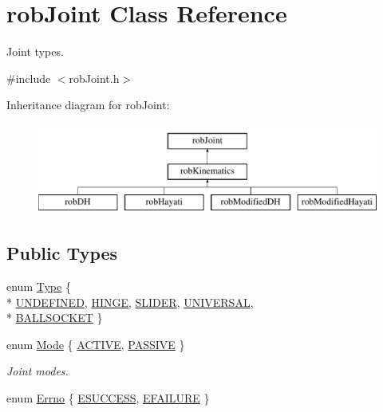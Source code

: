 \hypertarget{classrob_joint}{\section{rob\-Joint Class Reference}
\label{classrob_joint}
}


Joint types.  




{\ttfamily \#include $<$rob\-Joint.\-h$>$}

Inheritance diagram for rob\-Joint\-:\begin{figure}[H]
\begin{center}
\leavevmode
\includegraphics[height=3.000000cm]{d7/dea/classrob_joint}
\end{center}
\end{figure}
\subsection*{Public Types}
\begin{DoxyCompactItemize}
\item 
enum \hyperlink{classrob_joint_a558d78a642cf2101aceddce0d82379b6}{Type} \{ \\*
\hyperlink{classrob_joint_a558d78a642cf2101aceddce0d82379b6add9f4c43ce1dafb01044505f9df11eca}{U\-N\-D\-E\-F\-I\-N\-E\-D}, 
\hyperlink{classrob_joint_a558d78a642cf2101aceddce0d82379b6a7578ac9af1fcd64d77cf815743c46f95}{H\-I\-N\-G\-E}, 
\hyperlink{classrob_joint_a558d78a642cf2101aceddce0d82379b6a1d096119f127eeb8b3ec24ffb082f159}{S\-L\-I\-D\-E\-R}, 
\hyperlink{classrob_joint_a558d78a642cf2101aceddce0d82379b6a2266ef9d7d2a68c670d13c965a1ac200}{U\-N\-I\-V\-E\-R\-S\-A\-L}, 
\\*
\hyperlink{classrob_joint_a558d78a642cf2101aceddce0d82379b6a0521bb3cbb35a846d24e72f580f12e55}{B\-A\-L\-L\-S\-O\-C\-K\-E\-T}
 \}
\item 
enum \hyperlink{classrob_joint_a7f77320bad87c259f71c18443f7bdd9c}{Mode} \{ \hyperlink{classrob_joint_a7f77320bad87c259f71c18443f7bdd9cad6aa8d614e974346d51e6545f7459858}{A\-C\-T\-I\-V\-E}, 
\hyperlink{classrob_joint_a7f77320bad87c259f71c18443f7bdd9caf79cc5b15a16d7c0393c1491b4222b31}{P\-A\-S\-S\-I\-V\-E}
 \}
\begin{DoxyCompactList}\small\item\em Joint modes. \end{DoxyCompactList}\item 
enum \hyperlink{classrob_joint_a6656cb0c2f8c9aadf0c446abd6bebed7}{Errno} \{ \hyperlink{classrob_joint_a6656cb0c2f8c9aadf0c446abd6bebed7a543dbf6fd076d13f978a7fd7429d9986}{E\-S\-U\-C\-C\-E\-S\-S}, 
\hyperlink{classrob_joint_a6656cb0c2f8c9aadf0c446abd6bebed7ae679e9dfdb01c1ca7309f37d7c790efa}{E\-F\-A\-I\-L\-U\-R\-E}
 \}
\end{DoxyCompactItemize}
